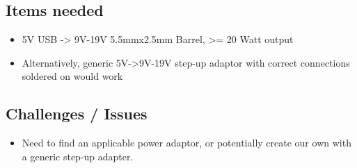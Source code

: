 \subsection*{Items needed}
\begin{itemize}
    \item 5V USB -> 9V-19V 5.5mmx2.5mm Barrel, >= 20 Watt output
    \item Alternatively, generic 5V->9V-19V step-up adaptor with correct connections soldered on would work
\end{itemize}

\subsection*{Challenges / Issues}
\begin{itemize}
    \item Need to find an applicable power adaptor, or potentially create our own with a generic step-up adapter.
\end{itemize}



